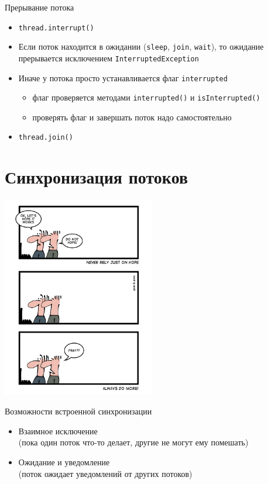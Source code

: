 \documentclass[unicode,mathserif]{beamer}
\begin{document}
\begin{frame}{Прерывание потока}
\begin{itemize}
\item \lstinline|thread.interrupt()|
    \bigskip

\item Если поток находится в ожидании (\texttt{sleep}, \texttt{join}, \texttt{wait}),
    то ожидание прерывается исключением \texttt{InterruptedException}
    \bigskip

\item Иначе у потока просто устанавливается флаг \texttt{interrupted}
    \begin{itemize}
    \item флаг проверяется методами \lstinline|interrupted()|
            и \lstinline|isInterrupted()|
    \item проверять флаг и завершать поток надо самостоятельно
    \end{itemize}
    \bigskip

\item \lstinline|thread.join()|
\end{itemize}
\end{frame}



\section{Синхронизация потоков}

\begin{frame}
\centering
\includegraphics[width=0.5\textwidth]{pics/hope.jpg}
\end{frame}


\begin{frame}{Возможности встроенной синхронизации}
\begin{itemize}
\item Взаимное исключение\\
    (пока один поток что-то делает, другие не могут ему помешать)
    \bigskip

\item Ожидание и уведомление\\
    (поток ожидает уведомлений от других потоков)
\end{itemize}
\end{frame}
\end{document}

